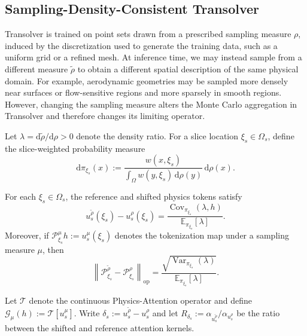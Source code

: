 \subsection{Sampling-Density-Consistent Transolver}
\label{sec:density_consistent_transolver}

Transolver is trained on point sets drawn from a prescribed sampling measure \(\rho\), induced by the discretization used to generate the training data, such as a uniform grid or a refined mesh. At inference time, we may instead sample from a different measure $\widetilde{\rho}$ to obtain a different spatial description of the same physical domain. For example, aerodynamic geometries may be sampled more densely near surfaces or flow-sensitive regions and more sparsely in smooth regions. However, changing the sampling measure alters the Monte Carlo aggregation in Transolver and therefore changes its limiting operator.

Let $\lambda=\mathrm{d}\widetilde{\rho}/\mathrm{d}\rho>0$ denote the density ratio. For a slice location $\xi_s\in\Omega_s$, define the slice-weighted probability measure
\begin{equation}
    \mathrm{d}\pi_{\xi_s}(x)
    :=\frac{w(x,\xi_s)}
    {\int_{\Omega}w(y,\xi_s)\,\mathrm{d}\rho(y)}\,\mathrm{d}\rho(x).
    \label{eq:main_slice_measure}
\end{equation}

\begin{proposition}
\label{prop:main_physics_token_bias}
For each $\xi_s\in\Omega_s$, the reference and shifted physics tokens satisfy
\begin{equation}
    u_s^{\widetilde{\rho}}(\xi_s)-u_s^{\rho}(\xi_s)
    =\frac{\operatorname{Cov}_{\pi_{\xi_s}}(\lambda,h)}
    {\mathbb{E}_{\pi_{\xi_s}}[\lambda]}.
    \label{eq:main_physics_token_bias}
\end{equation}
Moreover, if $\mathcal{P}_{\xi_s}^{\mu}h:=u_s^{\mu}(\xi_s)$ denotes the tokenization map under a sampling measure $\mu$, then
\begin{equation}
    \left\|\mathcal{P}_{\xi_s}^{\widetilde{\rho}}
    -\mathcal{P}_{\xi_s}^{\rho}\right\|_{\mathrm{op}}
    =\frac{\sqrt{\operatorname{Var}_{\pi_{\xi_s}}(\lambda)}}
    {\mathbb{E}_{\pi_{\xi_s}}[\lambda]}.
    \label{eq:main_token_operator_bias}
\end{equation}
\end{proposition}

Let $\mathcal{T}$ denote the continuous Physics-Attention operator and define $\mathcal{G}_{\mu}(h):=\mathcal{T}[u_s^{\mu}]$. Write $\delta_s:=u_s^{\widetilde{\rho}}-u_s^{\rho}$ and let $R_{\delta_s}:=\alpha_{u_s^{\widetilde{\rho}}}/\alpha_{u_s^{\rho}}$ be the ratio between the shifted and reference attention kernels.

